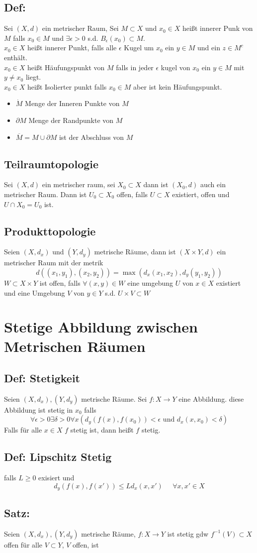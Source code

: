 \documentclass[]{scrartcl}
\begin{document}
\subsection{Def: }
Sei $(X,d)$ ein metrischer Raum, Sei $M\subset X$ und $x_0 \in X$ heißt innerer Punk von $M$ falls $x_0 \in M$ und $\exists\epsilon>0$ s.d. $B_\epsilon(x_0) \subset M$.\\
$x_0\in X$ heißt innerer Punkt, falls alle $\epsilon$ Kugel um $x_0$ ein $y\in M$ und ein $z\in M^c$ enthält.\\
$x_0\in X$ heißt Häufungspunkt von $M$ falls in jeder $\epsilon$ kugel von $x_0$ ein $y\in M$ mit $y\neq x_0$ liegt.\\
$x_0\in X$ heißt Isolierter punkt falls $x_0\in M$ aber ist kein Häufungspunkt.
\begin{itemize}
	\item $\dot M$ Menge der Inneren Punkte von $M$
	\item $\partial M$ Menge der Randpunkte von $M$
	\item $\overline M = M \cup \partial M$ ist der Abschluss von $M$ 
\end{itemize}

\subsection{Teilraumtopologie}
Sei $(X,d)$ ein metrischer raum, sei $X_0\subset X$ dann ist $(X_0, d)$ auch ein metrischer Raum. Dann ist $U_0 \subset X_0$ offen, falls $U\subset X$ existiert, offen und $U\cap X_0 = U_0$ ist.
\subsection{Produkttopologie}
Seien $(X,d_x)$ und $(Y,d_y)$ metrische Räume, dann ist $(X\times Y, d)$  ein metrischer Raum mit der metrik
$$
d((x_1,y_1), (x_2,y_2)) = \max(d_x(x_1,x_2), d_y(y_1, y_2))
$$
$W\subset X\times Y$ ist offen, falls $\forall (x,y)\in W$ eine umgebung $U$ von $x\in X$ existiert und eine Umgebung $V$ von $y\in Y$ s.d. $U\times V \subset W$ 

\section{Stetige Abbildung zwischen Metrischen Räumen}
\subsection{Def: Stetigkeit}
Seien $(X, d_x), (Y,d_y)$ metrische Räume. Sei $f:X\rightarrow Y$ eine Abbildung. diese Abbildung ist stetig in $x_0$ falls
$$
\forall \epsilon>0\exists\delta>0 \forall x(d_y(f(x),f(x_0)) < \epsilon \text{ und } d_x(x,x_0)<\delta)
$$
Falls für alle $x\in X$ $f$ stetig ist, dann heißt $f$ stetig.
\subsection{Def: Lipschitz Stetig}
falls $L\geq 0$ exisiert und
$$
d_y(f(x),f(x')) \leq Ld_x(x,x') \;\;\;\;\; \forall x,x'\in X
$$

\subsection{Satz: }
Seien $(X,d_x), (Y,d_y)$ metrische Räume, $f:X\rightarrow Y$ ist stetig gdw $f^{-1}(V) \subset X$ offen für alle $V\subset Y$, $V$ offen, ist
\end{document}

